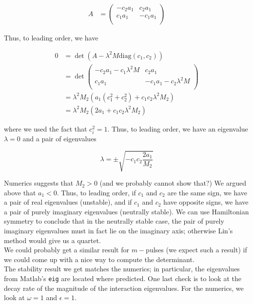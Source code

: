 \documentclass[12pt]{article}
\begin{document}
\begin{align*}
A &= \begin{pmatrix}
-c_2 a_1 & c_2 a_1 \\
c_1 a_1 & -c_1 a_1  \\
\end{pmatrix}
\end{align*}

Thus, to leading order, we have

\begin{align*}
0 &= \det(A - \lambda^2 M \text{diag}(c_1, c_2) ) \\
&= \det \begin{pmatrix}
-c_2 a_1 - c_1 \lambda^2 M & c_2 a_1 \\
c_1 a_1 & -c_1 a_1 - c_2 \lambda^2 M \\
\end{pmatrix} \\
&= \lambda^2 M_2 ( a_1 (c_1^2 + c_2^2) + c_1 c_2 \lambda^2 M_2) \\
&= \lambda^2 M_2 ( 2 a_1 + c_1 c_2 \lambda^2 M_2)
\end{align*}

where we used the fact that $c_i^2 = 1$. Thus, to leading order, we have an eigenvalue $\lambda = 0$ and a pair of eigenvalues

\[
\lambda = \pm \sqrt{ -c_1 c_2 \dfrac{2 a_1 }{ M_2 } }
\]

Numerics suggests that $M_2 > 0$ (and we probably cannot show that?) We argued above that $a_1 < 0$. Thus, to leading order, if $c_1$ and $c_2$ are the same sign, we have a pair of real eigenvalues (unstable), and if $c_1$ and $c_2$ have opposite signs, we have a pair of purely imaginary eigenvalues (neutrally stable). We can use Hamiltonian symmetry to conclude that in the neutrally stable case, the pair of purely imaginary eigenvalues must in fact lie on the imaginary axis; otherwise Lin's method would give us a quartet.\\

We could probably get a similar result for $m-$pulses (we expect such a result) if we could come up with a nice way to compute the determinant.\\

The stability result we get matches the numerics; in particular, the eigenvalues from Matlab's \texttt{eig} are located where predicted. One last check is to look at the decay rate of the magnitude of the interaction eigenvalues. For the numerics, we look at $\omega = 1$ and $\epsilon = 1$.\\
\end{document}
